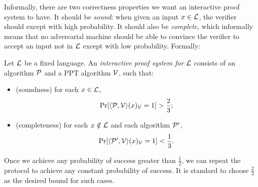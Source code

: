 Informally, there are two correctness properties we want an interactive proof
system to have. It should be \emph{sound}: when given an input $x\in\mathcal{L}$, the
verifier should except with high probability. It should also be \emph{complete},
which informally means that no adversarial machine should be able to convince
the verifier to accept an input not in $\mathcal{L}$ except with low probability.
Formally:
\begin{dfn}\label{def:interactive-proof-system}
  Let $\mathcal{L}$ be a fixed language. An \emph{interactive proof system for $\mathcal{L}$}
  consists of an algorithm $\mathcal{P}$ and a PPT algorithm $\mathcal{V}$, such that:
  \begin{itemize}
    \item (soundness) for each $x\in\mathcal{L}$, \[
        \Pr[\langle\mathcal{P},\mathcal{V}\rangle(x)_{\mathcal{V}} = 1] > \frac{2}{3};
      \]
    \item (completeness) for each $x\notin\mathcal{L}$ and each algorithm $\mathcal{P}'$, \[
        \Pr[\langle\mathcal{P}',\mathcal{V}\rangle(x)_{\mathcal{V}} = 1] < \frac{1}{3}.
      \]
  \end{itemize}
\end{dfn}
Once we achieve any probability of success greater than $\frac{1}{2}$, we can
repeat the protocol to achieve any constant probability of success. It is
standard to choose $\frac{2}{3}$ as the desired bound for such cases.

